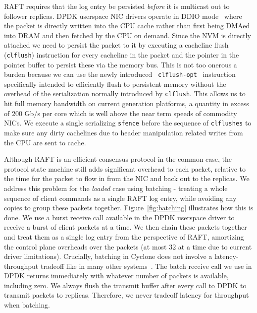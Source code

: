 \documentclass[pageno]{jpaper}
\begin{document}
RAFT requires that the log entry be persisted \emph{before} it is multicast out
to follower replicas. DPDK userspace NIC drivers operate in DDIO
mode~\cite{ddio} where the packet is directly written into the CPU cache rather
than first being DMAed into DRAM and then fetched by the CPU on demand. Since
the NVM is directly attached we need to persist the packet to it by executing a
cacheline flush ({\tt clflush}) instruction for every cacheline in the packet
and the pointer in the pointer buffer to persist these via the memory bus. This
is not too onerous a burden because we can use the newly introduced {\tt
  clflush-opt}~\cite{clflush_opt} instruction specifically intended to
efficiently flush to persistent memory without the overhead of the serialization
normally introduced by {\tt clflush}. This allows us to hit full memory
bandwidth on current generation platforms, a quantity in excess of 200 Gb/s per
core which is well above the near term speeds of commodity NICs. We execute a
single serializing {\tt sfence} before the sequence of {\tt clflushes} to make
sure any dirty cachelines due to header manipulation related writes from the CPU
are sent to cache.

Although RAFT is an efficient consensus protocol in the common case, the
protocol state machine still adds significant overhead to each packet, relative
to the time for the packet to flow in from the NIC and back out to the replicas.
We address this problem for the \emph{loaded} case using batching - treating a
whole sequence of client commands as a single RAFT log entry, while avoiding any
copies to group these packets together. Figure~\ref{fig:batching} illustrates
how this is done. We use a burst receive call available in the DPDK userspace
driver to receive a burst of client packets at a time. We then chain these
packets together and treat them as a single log entry from the perspective of
RAFT, amortizing the control plane overheads over the packets (at most 32 at a
time due to current driver limitations). Crucially, batching in Cyclone does not
involve a latency-throughput tradeoff like in many other
systems~\cite{ix-dataplane}. The batch receive call we use in DPDK returns
immediately with whatever number of packets is available, including zero. We
always flush the transmit buffer after every call to DPDK to transmit packets to
replicas. Therefore, we never tradeoff latency for throughput when batching. 
\end{document}
